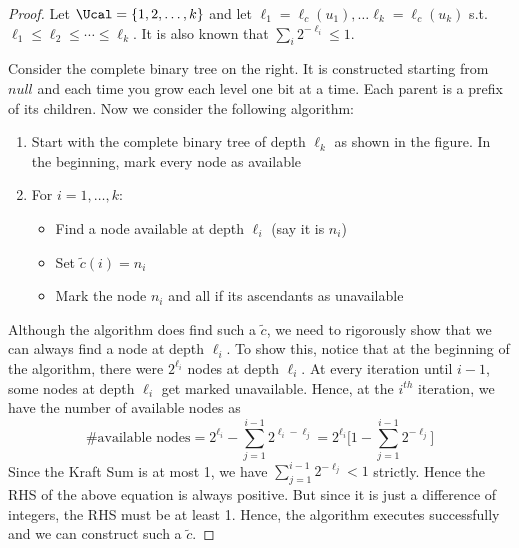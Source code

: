 \begin{proof}
Let $\Ucal = \{1,2,\dots, k\}$ and let $\ell_1 = \ell_c(u_1), \dots \ell_k = \ell_c(u_k)$ s.t. $\ell_1 \leq \ell_2 \leq \cdots \leq \ell_k$. It is also known that $\sum_i 2^{-\ell_i} \leq 1$. \\
\begin{minipage}{0.65\textwidth}
Consider the complete binary tree on the right. It is constructed starting from $null$ and each time you grow each level one bit at a time. Each parent is a prefix of its children. Now we consider the following algorithm: 
\begin{enumerate}
    \item Start with the complete binary tree of depth $\ell_k$ as shown in the figure. In the beginning, mark every node as available
    \item For $i=1,\dots,k$:
    \begin{itemize}
        \item Find a node available at depth $\ell_i$ (say it is $n_i$)
        \item Set $\widetilde{c}(i) = n_i$
        \item Mark the node $n_i$ and all if its ascendants as unavailable
    \end{itemize}
\end{enumerate}
\end{minipage}
\hspace{0.1\textwidth}
\begin{minipage}{0.25\textwidth}
\end{minipage}
Although the algorithm does find such a $\widetilde{c}$, we need to rigorously show that we can always find a node at depth $\ell_i$. To show this, notice that at the beginning of the algorithm, there were $2^{\ell_i}$ nodes at depth $\ell_i$. At every iteration until $i-1$, some nodes at depth $\ell_i$ get marked unavailable. Hence, at the $i^{th}$ iteration, we have the number of available nodes as
\[\text{\# available nodes} = 2^{\ell_i} - \sum_{j=1}^{i-1} 2^{\ell_i - \ell_j} = 2^{\ell_i}\bigg[1-\sum_{j=1}^{i-1} 2^{-\ell_j}\bigg]\]
Since the Kraft Sum is at most 1, we have $\sum_{j=1}^{i-1} 2^{-\ell_j} < 1$ strictly. Hence the RHS of the above equation is always positive. But since it is just a difference of integers, the RHS must be at least 1. Hence, the algorithm executes successfully and we can construct such a $\widetilde{c}$.
\end{proof}
